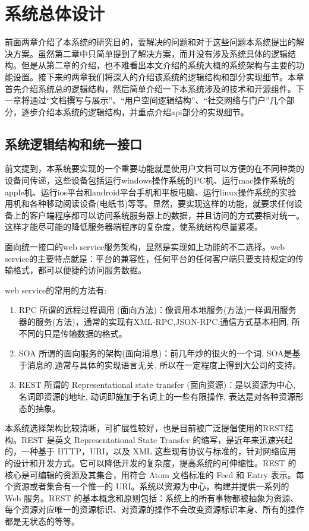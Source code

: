 
\chapter{系统总体设计}
\label{chap:design}

前面两章介绍了本系统的研究目的，要解决的问题和对于这些问题本系统提出的解决方案。虽然第二章中只简单提到了解决方案，而并没有涉及系统具体的逻辑结构。但是从第二章的介绍，也不难看出本文介绍的系统大概的系统架构与主要的功能设置。接下来的两章我们将深入的介绍该系统的逻辑结构和部分实现细节。本章首先介绍系统总的逻辑结构，然后简单介绍一下本系统涉及的技术和开源组件。下一章将通过“文档撰写与展示”、“用户空间逻辑结构”、“社交网络与门户”几个部分，逐步介绍本系统的逻辑结构，并重点介绍 api部分的实现细节。

\section{系统逻辑结构和统一接口}
\label{sec:restful}

前文提到，本系统要实现的一个重要功能就是使用户文档可以方便的在不同种类的设备间传递，这些设备包括运行windows操作系统的PC机、运行mac操作系统的apple机、运行ios平台和android平台手机和平板电脑、运行linux操作系统的实验用机和各种移动阅读设备(电纸书)等等。显然，要实现这样的功能，就要求任何设备上的客户端程序都可以访问系统服务器上的数据，并且访问的方式要相对统一。这样才能尽可能的降低服务器端程序的复杂度，使系统结构尽量紧凑。

面向统一接口的web service服务架构，显然是实现如上功能的不二选择。web service的主要特点就是：平台的兼容性，任何平台的任何客户端只要支持规定的传输格式，都可以便捷的访问服务数据。

web service的常用的方法有:
\begin{enumerate}
\item RPC 所谓的远程过程调用 (面向方法)：像调用本地服务(方法)一样调用服务器的服务(方法)，通常的实现有XML-RPC,JSON-RPC,通信方式基本相同, 所不同的只是传输数据的格式。
\item SOA 所谓的面向服务的架构(面向消息)：前几年炒的很火的一个词, SOA是基于消息的,通常与具体的实现语言无关, 所以在一定程度上得到大公司的支持。
\item REST 所谓的 Representational state transfer (面向资源)：是以资源为中心, 名词即资源的地址, 动词即施加于名词上的一些有限操作, 表达是对各种资源形态的抽象。
\end{enumerate}
本系统选择架构比较清晰，可扩展性较好，也是目前被广泛提倡使用的REST结构。REST 是英文 Representational State Transfer 的缩写，是近年来迅速兴起的，一种基于 HTTP，URI，以及 XML 这些现有协议与标准的，针对网络应用的设计和开发方式。它可以降低开发的复杂度，提高系统的可伸缩性。REST 的核心是可编辑的资源及其集合，用符合 Atom 文档标准的 Feed 和 Entry 表示。每个资源或者集合有一个惟一的 URI。系统以资源为中心，构建并提供一系列的 Web 服务。REST 的基本概念和原则包括：系统上的所有事物都被抽象为资源、每个资源对应唯一的资源标识、对资源的操作不会改变资源标识本身、所有的操作都是无状态的等等。

